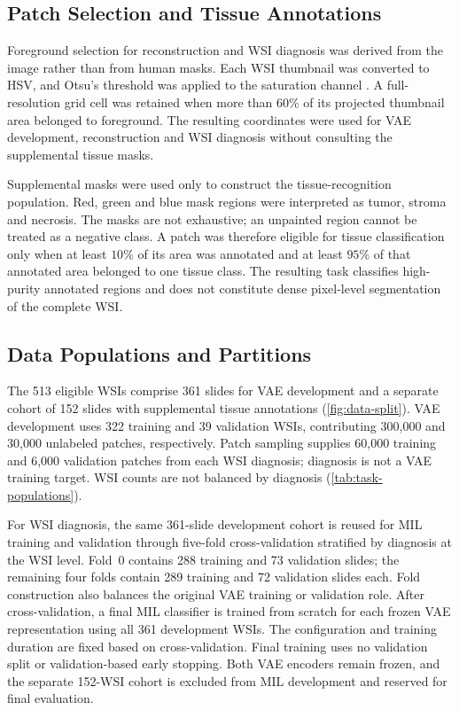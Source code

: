 \documentclass{midl}
\begin{document}
\subsection{Patch Selection and Tissue Annotations}

Foreground selection for reconstruction and WSI diagnosis was derived from the image rather than from human masks. Each WSI thumbnail was converted to HSV, and Otsu's threshold was applied to the saturation channel \cite{otsu_threshold_1979}. A full-resolution grid cell was retained when more than $60\%$ of its projected thumbnail area belonged to foreground. The resulting coordinates were used for VAE development, reconstruction and WSI diagnosis without consulting the supplemental tissue masks.

Supplemental masks were used only to construct the tissue-recognition population. Red, green and blue mask regions were interpreted as tumor, stroma and necrosis. The masks are not exhaustive; an unpainted region cannot be treated as a negative class. A patch was therefore eligible for tissue classification only when at least $10\%$ of its area was annotated and at least $95\%$ of that annotated area belonged to one tissue class. The resulting task classifies high-purity annotated regions and does not constitute dense pixel-level segmentation of the complete WSI.

\subsection{Data Populations and Partitions}

The 513 eligible WSIs comprise 361 slides for VAE development and a separate cohort of 152 slides with supplemental tissue annotations (\autoref{fig:data-split}). VAE development uses 322 training and 39 validation WSIs, contributing 300,000 and 30,000 unlabeled patches, respectively. Patch sampling supplies 60,000 training and 6,000 validation patches from each WSI diagnosis; diagnosis is not a VAE training target. WSI counts are not balanced by diagnosis (\autoref{tab:task-populations}).

For WSI diagnosis, the same 361-slide development cohort is reused for MIL training and validation through five-fold cross-validation stratified by diagnosis at the WSI level. Fold~0 contains 288 training and 73 validation slides; the remaining four folds contain 289 training and 72 validation slides each. Fold construction also balances the original VAE training or validation role. After cross-validation, a final MIL classifier is trained from scratch for each frozen VAE representation using all 361 development WSIs. The configuration and training duration are fixed based on cross-validation. Final training uses no validation split or validation-based early stopping. Both VAE encoders remain frozen, and the separate 152-WSI cohort is excluded from MIL development and reserved for final evaluation.
\end{document}
